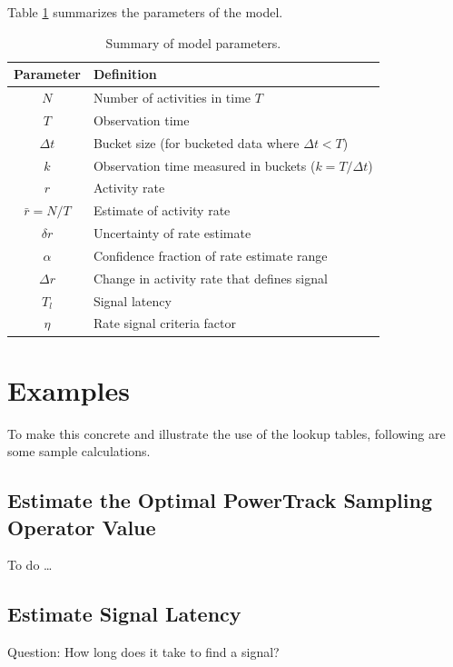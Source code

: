 \documentclass{article}
\begin{document}
Table \ref{tab:summary} summarizes the parameters of the model.

\begin{table}
    \begin{tabular}{c| m{7cm}}
     \hline
Parameter  & Definition \\
\hline	
$N$ & Number of activities in time $T$\\
$T$ & Observation time\\
$\Delta t$ & Bucket size (for bucketed data where $\Delta t <T$) \\
$k$ & Observation time measured in buckets ($k=T/\Delta t$) \\
$r$ & Activity rate \\
$\bar{r} = N/T$ & Estimate of activity rate \\
$\delta r$ & Uncertainty of rate estimate \\
$\alpha$ & Confidence fraction of rate estimate range\\
$\Delta r$ & Change in activity rate that defines signal \\
$T_l$ & Signal latency \\
$\eta$ & Rate signal criteria factor \\
\hline
\end{tabular}
\caption{Summary of model parameters.}
\label{tab:summary}
\end{table}

\section{Examples} %

To make this concrete and illustrate the use of the lookup tables, following are some sample calculations.

\subsection{Estimate the Optimal PowerTrack Sampling Operator Value} %

To do \ldots

\subsection{Estimate Signal Latency} %



Question: How long does it take to find a signal?\
\end{document}
